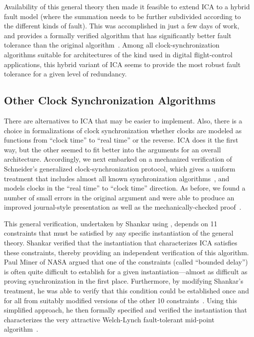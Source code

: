 Availability of this general theory then made it feasible to extend
ICA to a hybrid fault model (where the summation needs to be further
subdivided according to the different kinds of fault).  This was
accomplished in just a few days of work, and provides a formally
verified algorithm that has significantly better fault tolerance than
the original algorithm~\cite{Rushby94:icah}.  Among all
clock-synchronization algorithms suitable for architectures of the
kind used in digital flight-control applications, this hybrid variant
of ICA seems to provide the most robust fault tolerance for a given
level of redundancy.

\subsection{Other Clock Synchronization Algorithms}

There are alternatives to ICA that may be easier to implement.  Also,
there is a choice in formalizations of clock synchronization whether
clocks are modeled as functions from ``clock time'' to ``real time''
or the reverse.  ICA does it the first way, but the other seemed to
fit better into the arguments for an overall architecture.
Accordingly, we next embarked on a mechanized verification of
Schneider's generalized clock-synchronization protocol, which gives a
uniform treatment that includes almost all known synchronization
algorithms~\cite{Schneider:understanding}, and models clocks in the
``real time'' to ``clock time'' direction.  As before, we found a
number of small errors in the original argument and were able to
produce an improved journal-style presentation as well as the
mechanically-checked proof~\cite{Shankar:clocks:Nijmegen}.

This general verification, undertaken by Shankar using \ehdm, depends on 11
constraints that must be satisfied by any specific instantiation of
the general theory.  Shankar verified that the instantiation that
characterizes ICA satisfies these constraints, thereby providing an
independent verification of this algorithm.  Paul Miner of NASA
argued that one of the constraints (called ``bounded delay'') is
often quite difficult to establish for a given instantiation---almost
as difficult as proving synchronization in the first place.
Furthermore, by modifying Shankar's treatment, he was able to
verify that this condition could be established once and
for all from suitably modified versions of the other 10
constraints~\cite{Miner93}.  Using this simplified approach, he then
formally specified and verified the instantiation that characterizes
the very attractive Welch-Lynch fault-tolerant mid-point
algorithm~\cite{Welch&Lynch88}.


